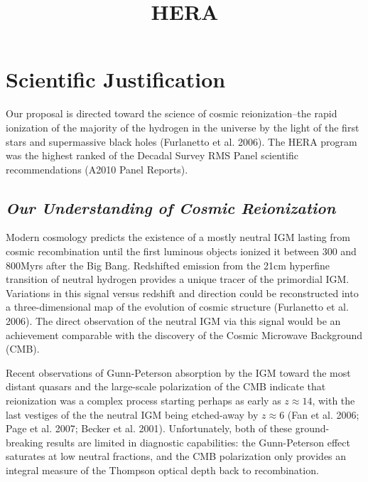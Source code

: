 \documentclass[preprint]{aastex}
\begin{document}
\title{HERA}


\section{Scientific Justification}

Our proposal is directed toward the science of cosmic reionization--the rapid 
ionization of the majority of the hydrogen
in the universe by the light of the first stars and supermassive black
holes (Furlanetto et al. 2006).  
The HERA program was the highest ranked of the Decadal Survey RMS Panel
scientific recommendations (A2010 Panel Reports).

\subsection{\it Our Understanding of Cosmic Reionization}
Modern cosmology predicts the existence of a mostly neutral IGM 
lasting from cosmic recombination until the first luminous
objects ionized it between 300 and 800Myrs after the Big Bang.
Redshifted emission from the 21cm hyperfine transition of neutral hydrogen provides a
unique tracer of the primordial IGM.   Variations in this signal
versus redshift and direction could be reconstructed into a
three-dimensional map of the evolution of cosmic structure (Furlanetto et al.
2006).  The direct observation of the neutral IGM via this signal
would be an achievement comparable with
the discovery of the Cosmic Microwave Background (CMB).

Recent observations of Gunn-Peterson absorption by the IGM
toward the most distant quasars and the
large-scale polarization of the CMB indicate that reionization was a
complex process starting
perhaps as early as $z \approx 14$, with the last vestiges of the the
neutral IGM being etched-away by $z \approx6$ (Fan et al. 2006; Page
et al. 2007; Becker et al. 2001).  Unfortunately, both of these
ground-breaking results are limited in diagnostic capabilities: the Gunn-Peterson
effect saturates at low neutral fractions, and the CMB polarization only provides
an integral measure of the Thompson optical depth back to
recombination.
\end{document}
